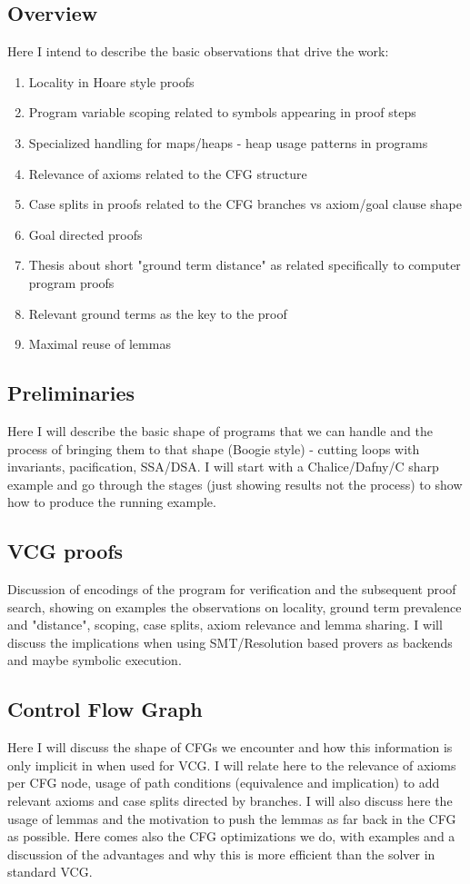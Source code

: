 
\subsection{Overview}
Here I intend to describe the basic observations that drive the work:
\begin{enumerate}
	\item Locality in Hoare style proofs
	\item Program variable scoping related to symbols appearing in proof steps
	\item Specialized handling for maps/heaps - heap usage patterns in programs
	\item Relevance of axioms related to the CFG structure
	\item Case splits in proofs related to the CFG branches vs axiom/goal clause shape
	\item Goal directed proofs
	\item Thesis about short "ground term distance" as related specifically to computer program proofs
	\item Relevant ground terms as the key to the proof
	\item Maximal reuse of lemmas
\end{enumerate}
	

\subsection{Preliminaries}
Here I will describe the basic shape of programs that we can handle and the process of bringing them to that shape (Boogie style) - cutting loops with invariants, pacification, SSA/DSA.
I will start with a Chalice/Dafny/C sharp example and go through the stages (just showing results not the process) to show how to produce the running example.

\subsection{VCG proofs}
Discussion of encodings of the program for verification and the subsequent proof search, showing on examples the observations on locality, ground term prevalence and "distance", scoping, case splits, axiom relevance and lemma sharing.
I will discuss the implications when using SMT/Resolution based provers as backends and maybe symbolic execution.

\subsection{Control Flow Graph}
Here I will discuss the shape of CFGs we encounter and how this information is only implicit in when used for VCG.
I will relate here to the relevance of axioms per CFG node, usage of path conditions (equivalence and implication) to add relevant axioms and case splits directed by branches.
I will also discuss here the usage of lemmas and the motivation to push the lemmas as far back in the CFG as possible.
Here comes also the CFG optimizations we do, with examples and a discussion of the advantages and why this is more efficient than the solver in standard VCG.

